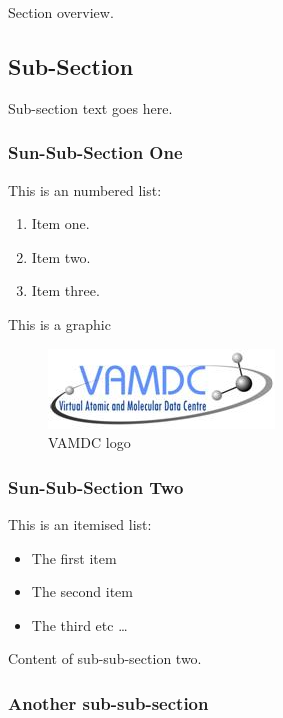 \documentclass{article}
\begin{document}
\noindent Section overview.

\subsection{Sub-Section}

\noindent Sub-section text goes here.

\subsubsection{ Sun-Sub-Section One}

\noindent This is an numbered list:

\begin{enumerate}
	\item  Item one.
	\item  Item two.
	\item  Item three.
\end{enumerate}


\noindent This is a graphic
\begin{figure}[!h]
\vspace*{-.3cm}
\begin{center}
\includegraphics{image001}
\caption{
\small{VAMDC logo}
}
\label{fig:1} %
\end{center}
\vspace*{-.5cm}
\end{figure}

\subsubsection{ Sun-Sub-Section Two}

\noindent This is an itemised list:
\begin{itemize}
  \item The first item
  \item The second item
  \item The third etc \ldots
\end{itemize}


\noindent Content of sub-sub-section two.

\subsubsection{ Another sub-sub-section}
\end{document}
